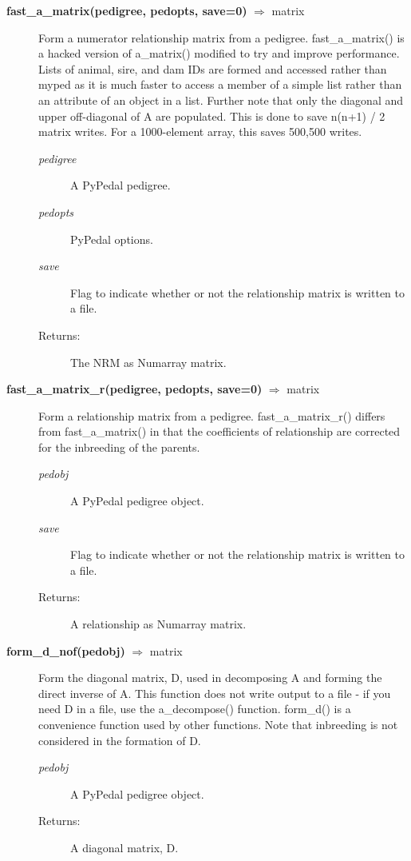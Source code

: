\begin{description}
\item[\textbf{fast\_a\_matrix(pedigree, pedopts, save=0)} $\Rightarrow$ matrix] 
Form a numerator relationship matrix from a pedigree. fast\_a\_matrix() is a hacked version of a\_matrix() modified to try and improve performance. Lists of animal, sire, and dam IDs are formed and accessed rather than myped as it is much faster to access a member of a simple list rather than an attribute of an object in a list. Further note that only the diagonal and upper off-diagonal of A are populated. This is done to save n(n+1) / 2 matrix writes. For a 1000-element array, this saves 500,500 writes.
\begin{description}
\item[\emph{pedigree}] A PyPedal pedigree.
\item[\emph{pedopts}] PyPedal options.
\item[\emph{save}] Flag to indicate whether or not the relationship matrix is written to a file.
\item[Returns:] The NRM as Numarray matrix.
\end{description}

\item[\textbf{fast\_a\_matrix\_r(pedigree, pedopts, save=0)} $\Rightarrow$ matrix] 
Form a relationship matrix from a pedigree. fast\_a\_matrix\_r() differs from fast\_a\_matrix() in that the coefficients of relationship are corrected for the inbreeding of the parents.
\begin{description}
\item[\emph{pedobj}] A PyPedal pedigree object.
\item[\emph{save}] Flag to indicate whether or not the relationship matrix is written to a file.
\item[Returns:] A relationship as Numarray matrix.
\end{description}

\item[\textbf{form\_d\_nof(pedobj)} $\Rightarrow$ matrix] 
Form the diagonal matrix, D, used in decomposing A and forming the direct inverse of A. This function does not write output to a file - if you need D in a file, use the a\_decompose() function. form\_d() is a convenience function used by other functions. Note that inbreeding is not considered in the formation of D.
\begin{description}
\item[\emph{pedobj}] A PyPedal pedigree object.
\item[Returns:] A diagonal matrix, D.
\end{description}


\end{description}
